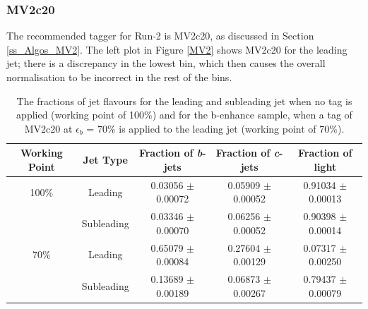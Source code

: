 \documentclass[12pt, onecolumn,notitlepage]{article}
\begin{document}
\subsubsection{MV2c20}

The recommended tagger for Run-2 is MV2c20, as discussed in Section \ref{ss_Algos_MV2}.
The left plot in Figure \ref{MV2} shows MV2c20 for the leading jet; there is a discrepancy in the lowest bin, 
which then causes the overall normalisation to be incorrect in the rest of the bins. 

\begin{table}[!htb]
  \vspace{+0.2cm}
  \begin{center}
    \begin{tabular}{ | c | c || c | c | c | }
      \hline
      Working Point & Jet Type  & Fraction of \textit{b}-jets &  Fraction of \textit{c}-jets & Fraction of light\\
      \hline

      100\% & Leading    & 0.03056 $\pm$ 0.00072 & 0.05909 $\pm$ 0.00052 & 0.91034 $\pm$ 0.00013 \\
            & Subleading & 0.03346 $\pm$ 0.00070 & 0.06256 $\pm$ 0.00052 & 0.90398 $\pm$ 0.00014 \\
      \hline
      70\%  & Leading    & 0.65079 $\pm$ 0.00084 & 0.27604 $\pm$ 0.00129 & 0.07317 $\pm$ 0.00250 \\
            & Subleading & 0.13689 $\pm$ 0.00189 & 0.06873 $\pm$ 0.00267 & 0.79437 $\pm$ 0.00079 \\
      \hline
    \end{tabular}
    \caption{The fractions of jet flavours for the leading and subleading jet when no tag is applied (working point of 100\%) and
      for the b-enhance sample, when a tag of MV2c20 at $\epsilon_{b}$ = 70\% is applied to the leading jet (working point of 70\%). }
    \label{benhance_table}
    \vspace{-0.8cm}

  \end{center}
\end{table}
\end{document}
